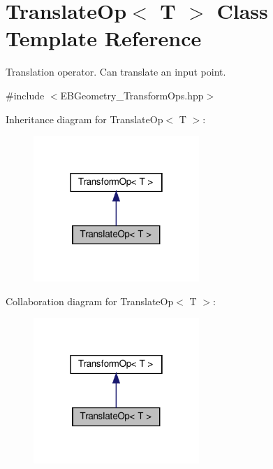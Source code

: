 \hypertarget{classTranslateOp}{}\section{Translate\+Op$<$ T $>$ Class Template Reference}
\label{classTranslateOp}


Translation operator. Can translate an input point.  




{\ttfamily \#include $<$E\+B\+Geometry\+\_\+\+Transform\+Ops.\+hpp$>$}



Inheritance diagram for Translate\+Op$<$ T $>$\+:\nopagebreak
\begin{figure}[H]
\begin{center}
\leavevmode
\includegraphics[width=178pt]{classTranslateOp__inherit__graph}
\end{center}
\end{figure}


Collaboration diagram for Translate\+Op$<$ T $>$\+:\nopagebreak
\begin{figure}[H]
\begin{center}
\leavevmode
\includegraphics[width=178pt]{classTranslateOp__coll__graph}
\end{center}
\end{figure}
